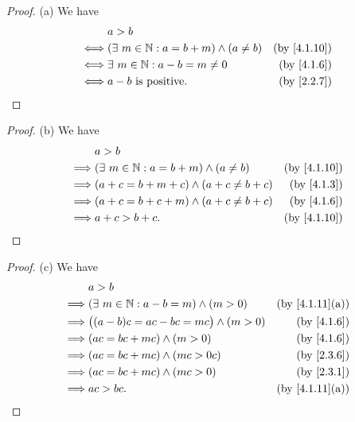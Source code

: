 \begin{proof}{(a)}
  We have
  \begin{align*}
         & a > b                                                                        \\
    \iff & (\exists\ m \in \N : a = b + m) \land (a \neq b) & \text{(by \cref{4.1.10})} \\
    \iff & \exists\ m \in \N : a - b = m \neq 0             & \text{(by \cref{4.1.6})}  \\
    \iff & a - b \text{ is positive}.                       & \text{(by \cref{2.2.7})}
  \end{align*}
\end{proof}

\begin{proof}{(b)}
  We have
  \begin{align*}
             & a > b                                                                        \\
    \implies & (\exists\ m \in \N : a = b + m) \land (a \neq b) & \text{(by \cref{4.1.10})} \\
    \implies & (a + c = b + m + c) \land (a + c \neq b + c)     & \text{(by \cref{4.1.3})}  \\
    \implies & (a + c = b + c + m) \land (a + c \neq b + c)     & \text{(by \cref{4.1.6})}  \\
    \implies & a + c > b + c.                                   & \text{(by \cref{4.1.10})}
  \end{align*}
\end{proof}

\begin{proof}{(c)}
  We have
  \begin{align*}
             & a > b                                                                          \\
    \implies & (\exists\ m \in \N : a - b = m) \land (m > 0)   & \text{(by \cref{4.1.11}(a))} \\
    \implies & \big((a - b)c = ac - bc = mc\big) \land (m > 0) & \text{(by \cref{4.1.6})}     \\
    \implies & (ac = bc + mc) \land (m > 0)                    & \text{(by \cref{4.1.6})}     \\
    \implies & (ac = bc + mc) \land (mc > 0c)                  & \text{(by \cref{2.3.6})}     \\
    \implies & (ac = bc + mc) \land (mc > 0)                   & \text{(by \cref{2.3.1})}     \\
    \implies & ac > bc.                                        & \text{(by \cref{4.1.11}(a))}
  \end{align*}
\end{proof}

